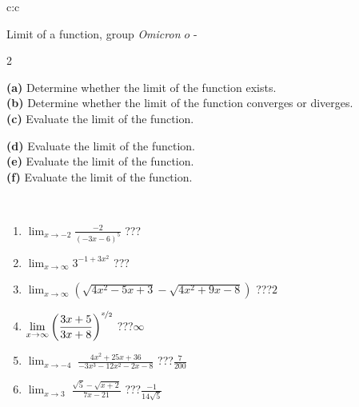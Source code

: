 \documentclass[10pt]{report}
\newcommand\omicron{o}
\begin{document}
\newpage
\thispagestyle{empty}
\begin{tabular}{c:c}
\begin{minipage}[c][104.5mm][t]{0.5\linewidth}
\begin{center}
\vspace{5mm}
{\huge Limit of a function, group \textit{Omicron $\omicron$} -}\\[5mm]
\begin{minipage}{0.95\linewidth}
\begin{center}
{\small \begin{multicols}{2} \raggedright
\textbf{(a)} Determine whether the limit of the function exists. \\[1mm]
\textbf{(b)} Determine whether the limit of the function converges or diverges. \\[1mm]
\textbf{(c)} Evaluate the limit of the function. \par \columnbreak
\textbf{(d)} Evaluate the limit of the function. \\[1mm]
\textbf{(e)} Evaluate the limit of the function. \\[1mm]
\textbf{(f)} Evaluate the limit of the function. \\[1mm]
\end{multicols}
}
\end{center}
\end{minipage}
\\[1mm]
\begin{minipage}{0.79\linewidth}
\begin{center}
\begin{varwidth}{\linewidth}
\setlength{\itemsep}{0pt}
\begin{enumerate}
\normalsize
\item $\displaystyle\lim_{x\to-2}{\frac{-2}{(-3x-6)^{5}}}$\quad \dotfill\; ???\;\dotfill \quad {}
\item $\displaystyle\lim_{x\to\infty}{3^{-1+3x^2}}$\quad \dotfill\; ???\;\dotfill \quad {}
\item $\displaystyle\lim_{x\to\infty}{\left(\sqrt{4x^2-5x+3} - \sqrt{4x^2+9x-8}\right)}$\quad \dotfill\; ???\;\dotfill \quad $2$
\item $\displaystyle\lim_{x\to\infty}{\left( \frac{3x+5}{3x+8} \right)^{\nicefrac{x}{2}}}$\quad \dotfill\; ???\;\dotfill \quad $\infty$
\item $\displaystyle\lim_{x\to -4}{\;\frac{4x^2+25x+36}{-3x^3-12x^2-2x-8}}$\quad \dotfill\; ???\;\dotfill \quad $\frac{7}{200}$
\item $\displaystyle\lim_{x\to 3}{\;\frac{\sqrt{5}-\sqrt{x+2}}{7x-21}}$\quad \dotfill\; ???\;\dotfill \quad $\frac{-1}{14\sqrt{5}}$

\end{enumerate}
\end{varwidth}
\end{center}
\end{minipage}
\end{center}
\end{minipage}
\end{tabular}
\end{document}

